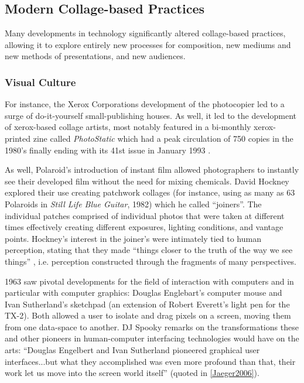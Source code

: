 \documentclass[a4paper,11pt,final]{ThesisStyle}
\begin{document}
\subsection{Modern Collage-based Practices}
Many developments in technology significantly altered collage-based practices, allowing it to explore entirely new processes for composition, new mediums and new methods of presentations, and new audiences. 

\subsubsection{Visual Culture}
For instance, the Xerox Corporations development of the photocopier led to a surge of do-it-yourself small-publishing houses.  As well, it led to the development of xerox-based collage artists, most notably featured in a bi-monthly xerox-printed zine called \textit{PhotoStatic} which had a peak circulation of 750 copies in the 1980's finally ending with its 41st issue in January 1993 \cite{McLeod2011}.  

As well, Polaroid's introduction of instant film allowed photographers to instantly see their developed film without the need for mixing chemicals.  David Hockney explored their use creating patchwork collages (for instance, using as many as 63 Polaroids in \textit{Still Life Blue Guitar}, 1982) which he called ``joiners''.  The individual patches comprised of individual photos that were taken at different times effectively creating different exposures, lighting conditions, and vantage points.  Hockney's interest in the joiner's were intimately tied to human perception, stating that they made ``things closer to the truth of the way we see things'' \cite{Joyce1988}, i.e. perception constructed through the fragments of many perspectives.

1963 saw pivotal developments for the field of interaction with computers and in particular with computer graphics: Douglas Englebart's computer mouse and Ivan Sutherland's sketchpad (an extension of Robert Everett's light pen for the TX-2).  Both allowed a user to isolate and drag pixels on a screen, moving them from one data-space to another.  DJ Spooky remarks on the transformations these and other pioneers in human-computer interfacing technologies would have on the arts: ``Douglas Engelbert and Ivan Sutherland pioneered graphical user interfaces...but what they accomplished was even more profound than that, their work let us move into the screen world itself'' (quoted in \ref{Jaeger2006}).  
\end{document}
